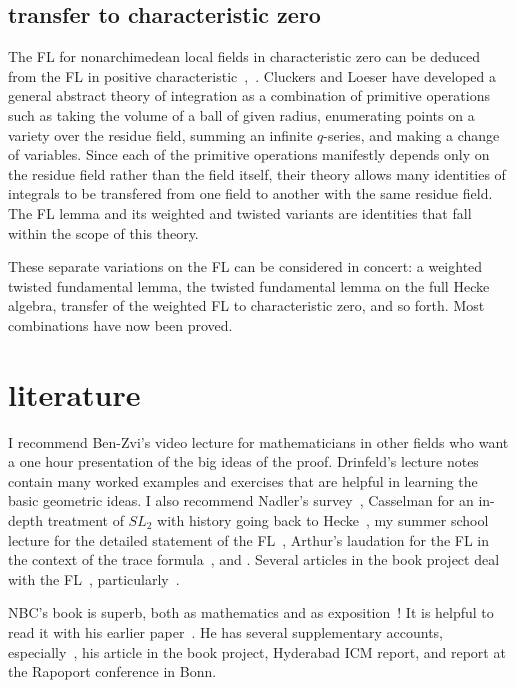 \documentclass[brochure,english,12pt]{bourbaki}
\begin{document}
\subsection{transfer to characteristic zero}

The FL for nonarchimedean local fields in
characteristic zero can be deduced from the FL in
positive characteristic~\cite{Wald:2006},~\cite{CHL:2010}.  Cluckers and Loeser have developed a
general abstract theory of integration as a combination of primitive
operations such as taking the volume of a ball of given radius,
enumerating points on a variety over the residue field, summing an
infinite $q$-series, and making a change of variables.  Since
each of the primitive operations manifestly depends only on the
residue field rather than the field itself, their theory allows many
identities of integrals to be transfered from one field to another
with the same residue field.  The FL lemma and its weighted and
twisted variants are identities that fall within the scope of this
theory.

These separate variations on the FL can be considered in concert: a
weighted twisted fundamental lemma, the twisted fundamental lemma on
the full Hecke algebra, transfer of the weighted FL to characteristic zero, and so forth.
Most combinations have now been proved.

\section{literature}

I recommend Ben-Zvi's video lecture for mathematicians in other fields
who want a one hour presentation of the big ideas of the proof.
Drinfeld's lecture notes contain many worked examples and exercises
that are helpful in learning the basic geometric ideas.  I also
recommend Nadler's survey~\cite{Nadler:2010}, Casselman for an
in-depth treatment of $SL_2$ with history going back to
Hecke~\cite{Cass:2010}, my summer school lecture for the detailed
statement of the FL~\cite{Hales:FL-statement},  Arthur's laudation
for the FL in the context of the trace formula~\cite{Arthur:2010}, and \cite{CHLaumon:2010}.
Several articles in the 
book project \cite{Harris:book-project} deal with the FL~\cite{Harris:book-project}, 
particularly~\cite{DN:2010}.


NBC's book is superb, both as mathematics and as
exposition~\cite{NBC:2010}!  It is helpful to read it with his earlier
paper~\cite{NBC:2006}.  He has several supplementary accounts,
especially~\cite{NBC:report}, his article in the book project, Hyderabad ICM report,
and report at the Rapoport conference in Bonn.
\end{document}
